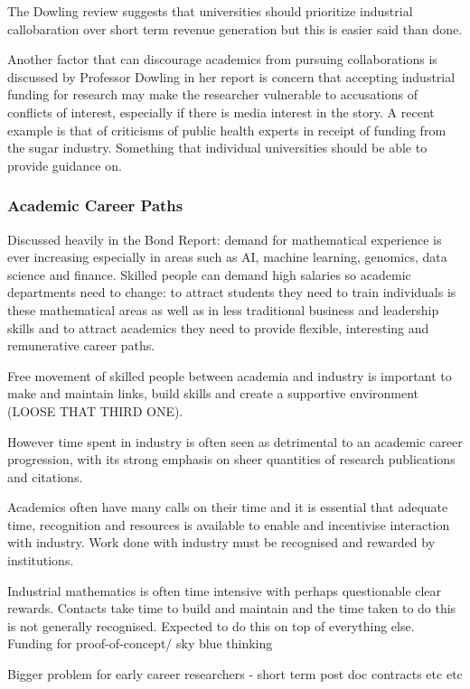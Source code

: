 \documentclass[11pt]{article} %
\begin{document}
	 The Dowling review \cite{DOWLING2015} suggests that universities should prioritize industrial callobaration over short term revenue generation but this is easier said than done. 
	
	Another factor that can discourage academics from pursuing collaborations is discussed by Professor Dowling in her report \cite{DOWLING2015} is concern that accepting industrial funding for research may make the researcher vulnerable to accusations of conflicts of interest, especially if there is media interest in the story. A recent example is that of  criticisms of public health experts in receipt of funding from the sugar industry. Something that individual universities should be able to provide guidance on. 
	\subsubsection{Academic Career Paths} 
	Discussed heavily in the Bond Report: demand for mathematical experience is ever increasing especially in areas such as AI, machine learning, genomics, data science and finance. Skilled people can demand high salaries so academic departments need to change: to attract students they need to train individuals is these mathematical areas as well as in less traditional business and leadership skills and to attract academics they need to provide flexible, interesting  and remunerative career paths. 
	
	Free movement of skilled people between academia and industry is important to make and maintain links, build skills and create a supportive environment (LOOSE THAT THIRD ONE). 
	
	However time spent in industry is often seen as detrimental to an academic career progression, with its strong emphasis on sheer quantities of research publications and citations. 
	
	Academics often have many calls on their time and it is essential that adequate time, recognition and resources is available to enable and incentivise interaction with industry. Work done with industry must be recognised and rewarded by institutions. 
	
	Industrial mathematics is often time intensive with perhaps questionable clear rewards. Contacts take time to build and maintain and the time taken to do this is not generally recognised. Expected to do this on top of everything else. Funding for proof-of-concept/ sky blue thinking
	
	Bigger problem for early career researchers - short term post doc contracts etc etc   
	
\end{document}
